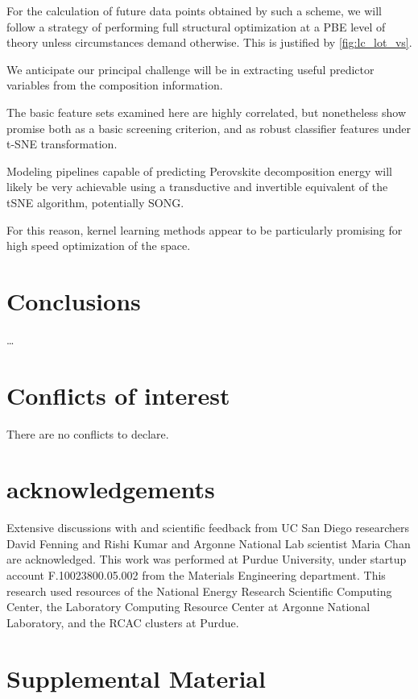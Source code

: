 \documentclass[twoside, twocolumn, 9pt, draft]{article}
\begin{document}
For the calculation of future data points obtained by such a scheme,
we will follow a strategy of performing full structural optimization
at a PBE level of theory unless circumstances demand otherwise. This
is justified by \ref{fig:lc_lot_vs}.

We anticipate our principal challenge will be in extracting useful
predictor variables from the composition information.

The basic feature sets examined here are highly correlated, but
nonetheless show promise both as a basic screening criterion, and as
robust classifier features under t-SNE transformation.

Modeling pipelines capable of predicting Perovskite decomposition
energy will likely be very achievable using a transductive and
invertible equivalent of the tSNE algorithm, potentially SONG.

For this reason, kernel learning methods appear to be particularly
promising for high speed optimization of the space.

\section*{Conclusions}
\label{sec:org28faf5d}
\ldots{}\\

\section*{Conflicts of interest}
\label{sec:orgb4559db}
There are no conflicts to declare.

\section*{acknowledgements}
\label{sec:org3cb9e0e}
Extensive discussions with and scientific feedback from UC San Diego
researchers David Fenning and Rishi Kumar and Argonne National Lab
scientist Maria Chan are acknowledged. This work was performed at Purdue
University, under startup account F.10023800.05.002 from the Materials
Engineering department. This research used resources of the National
Energy Research Scientific Computing Center, the Laboratory Computing
Resource Center at Argonne National Laboratory, and the RCAC clusters at
Purdue.



\section*{Supplemental Material}
\label{sec:org6758eda}
\end{document}
